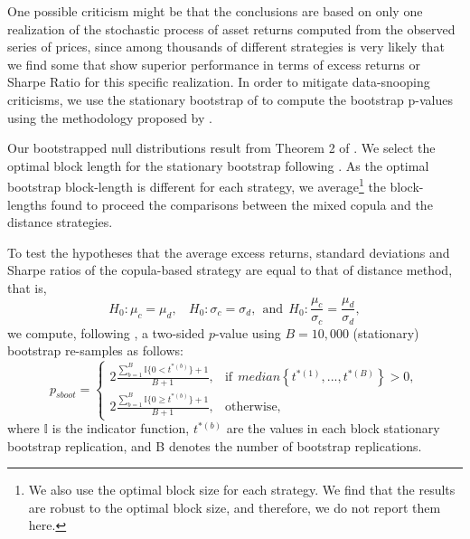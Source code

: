 \documentclass[a4paper]{article}
\begin{document}
One possible criticism might be that the conclusions are based on only one realization of the stochastic process of asset returns computed from the observed series of prices, since among thousands of different strategies is very likely that we find some that show superior performance in terms of excess returns or Sharpe Ratio for this specific realization. In order to mitigate data-snooping criticisms, we use the stationary bootstrap of \citet*{pr94} to compute the bootstrap p-values using the methodology proposed by \citet*{lw08}. 


Our bootstrapped null distributions result from Theorem 2 of \citet*{pr94}. We select the optimal block length for the stationary bootstrap following \citet*{pw04}. As the optimal bootstrap block-length is different for each strategy, we average\footnote{We also use the optimal block size for each strategy. We find that the results are robust to the optimal block size, and therefore, we do not report them here.} the block-lengths found to proceed the comparisons between the mixed copula and the distance strategies.

To test the hypotheses that the average excess returns, standard deviations and Sharpe ratios of the copula-based strategy are equal to that of distance method, that is,
\begin{equation}
H_{0}:\mu_{c}=\mu_{d},  \ \
\ \  H_{0}:\sigma_{c}=\sigma_{d},
\ \ \textrm{and} \ \ H_{0}:\frac{\mu_{c}}{\sigma_{c}}=\frac{\mu_{d}}{\sigma_{d}},
\label{eq:eq153}
\end{equation}
we compute, following \citet*{davison1997}, a two-sided $p$-value using $B=10,000$ (stationary) bootstrap re-samples as follows:
\begin{equation}
p_{sboot}=
\begin{cases}
2\frac{\sum_{b=1}^{B}\mathbb{I}\{0< t^{\ast(b)}\}+1}{B+1}, &\text{if} ~~median\left\{ t^{\ast \left( 1\right) },...,t^{\ast \left( B\right)}\right\} > 0, \\
2\frac{\sum_{b=1}^{B}\mathbb{I}\{0\geq t^{\ast(b)}\}+1}{B+1}, &\text{otherwise},
\end{cases}
\label{eq:eq152}
\end{equation}
where $\mathbb{I}$ is the indicator function, $t^{\ast(b)}$ are the values in each block stationary bootstrap replication, and B denotes the number of bootstrap replications.
\end{document}
